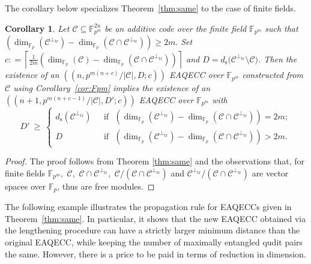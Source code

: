 \documentclass{article}
\DeclareMathOperator{\tr}{tr}
\DeclareMathOperator{\Tr}{Tr}
\def\F{\mathbb{F}}
\newtheorem{cor}{Corollary}[section]
\theoremstyle{remark}
\theoremstyle{definition}
\numberwithin{equation}{section}
\begin{document}
The corollary below specializes Theorem~\ref{thm:same} to the case of finite fields. 

\begin{cor} Let $\mathcal{C} \subseteq \mathbb{F}_{p^m}^{2n}$ be an additive code over the finite field $\F_{p^m}$ such that $(\dim_{\F_p}(\mathcal{C}^{\perp_{\tr}}) - \dim_{\F_p}(\mathcal{C} \cap \mathcal{C}^{\perp_{\tr}})) \geq 2m.$ Set $c : = \left\lceil  \frac{1}{2m} (\dim_{\F_p}(\mathcal{C}) - \dim_{\F_p}(\mathcal{C} \cap \mathcal{C}^{\perp_{\tr}})) \right\rceil $ and $D=d_{\mathrm{s}}\bigl({\mathcal{C}}^{\perp_{\tr}} \setminus \mathcal{C}\bigr)$.  Then the existence of an $((n,p^{m(n+c)}/{|\mathcal{C}|},D;c))$ EAQECC over $\mathbb{F}_{p^m}$ constructed from $\mathcal{C}$ using Corollary~\ref{cor:Fpm} implies the existence of an $((n+1,p^{m(n+c-1)}/{|\mathcal{C}|},D';c))$ EAQECC over $ \mathbb{F}_{p^m}$ with
  \begin{equation*}
D'~\geq ~\left\{\begin{array}{ll}
d_{\mathrm{s}}(\mathcal{C}^{\perp_{\tr}})  & \text{~~if~~} (\dim_{\F_p}(\mathcal{C}^{\perp_{\tr}}) - \dim_{\F_p}(\mathcal{C} \cap \mathcal{C}^{\perp_{\tr}}))  =2m; \\
D   & \text{~~if~~} (\dim_{\F_p}(\mathcal{C}^{\perp_{\tr}}) - \dim_{\F_p}(\mathcal{C} \cap \mathcal{C}^{\perp_{\tr}}))  >2m.\,
\end{array}\right.
\end{equation*}
 \end{cor}
\begin{proof} The proof follows from Theorem \ref{thm:same} and the observations that, for finite fields $\F_{p^m},$ $\mathcal{C},$ $\mathcal{C} \cap \mathcal{C}^{\perp_{\tr}},$ $\mathcal{C}/(\mathcal{C} \cap \mathcal{C}^{\perp_{\tr}})$ and $\mathcal{C}^{\perp_{\tr}}/(\mathcal{C} \cap \mathcal{C}^{\perp_{\tr}})$ are vector spaces over $\F_p$, thus are free modules.\end{proof}


The following example illustrates the propagation rule for EAQECCs given in Theorem~\ref{thm:same}. In particular, it shows that the new EAQECC obtained via the lengthening procedure can have a strictly larger minimum distance than the original EAQECC, while keeping the number of maximally entangled qudit pairs the same. However, there is a price to be paid in terms of reduction in dimension. 
\end{document}
